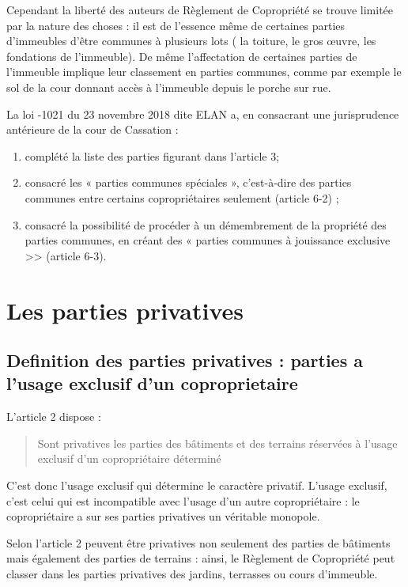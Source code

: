 	Cependant la liberté des auteurs de Règlement de Copropriété se trouve limitée par la nature des choses :
	il est de l'essence même de certaines parties d'immeubles d'être communes à plusieurs lots ( la toiture,
	le gros œuvre, les fondations de l'immeuble). De même l'affectation de certaines parties de l'immeuble
	implique leur classement en parties communes, comme par exemple le sol de la cour donnant accès à
	l'immeuble depuis le porche sur rue.
	
	La loi -1021 du 23 novembre 2018 dite ELAN a, en consacrant une jurisprudence antérieure de la
	cour de Cassation :
	\begin{enumerate}
		\item complété la liste des parties figurant dans l’article 3;
		\item consacré les « parties communes spéciales », c’est-à-dire des parties
		communes entre certains copropriétaires seulement (article 6-2) ;
		\item  consacré la possibilité de procéder à un démembrement de la
		propriété des parties communes, en créant des « parties communes
		à jouissance exclusive >> (article 6-3).
	\end{enumerate}

\section{Les parties privatives}

	\subsection{Definition des parties privatives : parties a l’usage exclusif d’un	coproprietaire}

		L'article 2 dispose :
		\begin{quote}
			Sont privatives les parties des bâtiments et des terrains réservées à l'usage exclusif d'un copropriétaire déterminé
		\end{quote}
		C'est donc l'usage exclusif qui détermine le caractère privatif. L'usage exclusif, c'est celui qui est
		incompatible avec l'usage d'un autre copropriétaire : le copropriétaire a sur ses parties privatives un
		véritable monopole.
		
		Selon l'article 2 peuvent être privatives non seulement des parties de bâtiments mais également des
		parties de terrains : ainsi, le Règlement de Copropriété peut classer dans les parties privatives des jardins,
		terrasses ou cours d'immeuble.
		

